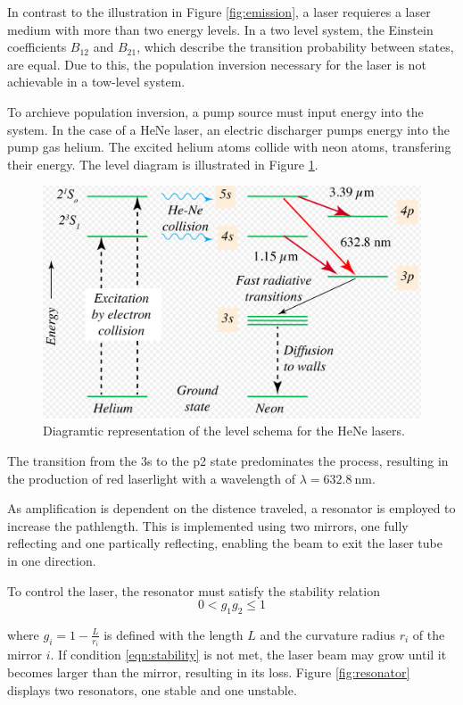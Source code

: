 In contrast to the illustration in Figure \ref{fig:emission}, a laser 
requieres a laser medium with more than two energy levels. In a two 
level system, the Einstein coefficients $B_{12}$ and $B_{21}$, which 
describe the transition probability between states, are equal. Due to 
this, the population inversion necessary for the laser is not achievable
in a tow-level system.

To archieve population inversion, a pump source must input energy 
into the system. In the case of a HeNe laser, an electric discharger 
pumps energy into the pump gas helium. The excited helium atoms 
collide with neon atoms, transfering their energy. The level diagram is 
illustrated in Figure \ref{fig:level}.

\begin{figure}
    \centering
    \includegraphics[width=0.7\linewidth]{pictures/level.png} %
    \caption{Diagramtic representation of the level schema for the HeNe lasers. \cite{Wikipedia}}
    \label{fig:level}
\end{figure}
The transition from the 3s to the p2 state predominates the process, 
resulting in the production of red laserlight with a wavelength of 
$\lambda = \SI{632.8}{\nano\meter}$.

As amplification is dependent on the distence traveled, a resonator is 
employed to increase the pathlength. This is implemented using two 
mirrors, one fully reflecting and one partically reflecting, enabling
the beam to exit the laser tube in one direction.

To control the laser, the resonator must satisfy the stability relation
\begin{equation}
    0 < g_1g_2 \leq 1
    \label{eqn:stability}
\end{equation}

where $g_i=1-\frac{L}{r_i}$ is defined with the length $L$ and the 
curvature radius $r_i$ of the mirror $i$. If condition \eqref{eqn:stability}
is not met, the laser beam may grow until it becomes larger than the mirror,
resulting in its loss. Figure \ref{fig:resonator} displays two resonators,
one stable and one unstable. 

